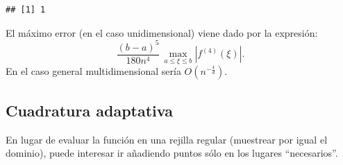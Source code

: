 \documentclass[]{book}
\theoremstyle{definition}
\theoremstyle{definition}
\theoremstyle{definition}
\theoremstyle{remark}
\begin{document}
\begin{verbatim}
## [1] 1
\end{verbatim}

El máximo error (en el caso unidimensional) viene dado por la expresión:
\[\frac{(b-a)^5}{180n^4}\,\max_{a\leq \xi \leq b}\left| f^{(4)}(\xi) \right|.\]
En el caso general multidimensional sería \(O(n^{-\frac{4}{d}})\).

\subsection{Cuadratura adaptativa}\label{cuadratura-adaptativa}

En lugar de evaluar la función en una rejilla regular (muestrear por
igual el dominio), puede interesar ir añadiendo puntos sólo en los
lugares ``necesarios''.
\end{document}
